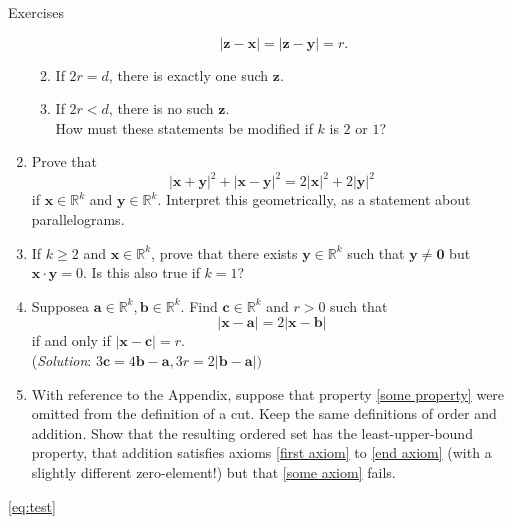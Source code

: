 \begin{xcb}{Exercises}
\begin{enumerate}
\begin{enumerate}
\begin{equation*}
        \left|\boldsymbol{z}-\boldsymbol{x}\right|=\left|\boldsymbol{z}-\boldsymbol{y}\right|=r.
      \end{equation*}
      \item If $2r=d$, there is exactly one such $\boldsymbol{z}$.
      \item If $2r<d$, there is no such $\boldsymbol{z}$.\\
      How must these statements be modified if $k$ is $2$ or $1$?
    \end{enumerate}
    \item Prove that
    \begin{equation*}
      \left|\boldsymbol{x}+\boldsymbol{y}\right|^2+\left|\boldsymbol{x}-\boldsymbol{y}\right|^2=2\left|\boldsymbol{x}\right|^2+2\left|\boldsymbol{y}\right|^2
    \end{equation*}
    if $\boldsymbol{x}\in \mathbb{R}^k$ and $\boldsymbol{y}\in \mathbb{R}^k$. Interpret this geometrically, as a statement about parallelograms. 
    \item If $k \geq 2$ and $\boldsymbol{x} \in \mathbb{R}^k$, prove that there exists $\boldsymbol{y} \in \mathbb{R}^k$ such that $\boldsymbol{y} \neq \boldsymbol{0}$
    but $\boldsymbol{x} \cdot \boldsymbol{y}=0$. Is this also true if $k=1$?
    \item Supposea $\boldsymbol{a} \in \mathbb{R}^k,\boldsymbol{b} \in \mathbb{R}^k$. Find $\boldsymbol{c} \in \mathbb{R}^k$ and $r> 0$ such 
    that 
    \begin{equation*}
      \left|\boldsymbol{x}-\boldsymbol{a}\right|=2\left|\boldsymbol{x}-\boldsymbol{b}\right|
    \end{equation*}
    if and only if $\left|\boldsymbol{x}-\boldsymbol{c}\right|=r$.\\
    (\emph{Solution}: $3\boldsymbol{c}=4\boldsymbol{b}-\boldsymbol{a},3r=2\left|\boldsymbol{b}-\boldsymbol{a}\right|)$
    \item With reference to the Appendix, suppose that property \ref{some property} were omitted from the definition of a cut. 
    Keep the same definitions of order and addition. Show that the resulting ordered set has the least-upper-bound property, 
    that addition satisfies axioms \ref{first axiom} to \ref{end axiom} (with a slightly different zero-element!) but that \ref{some axiom} fails.
  \end{enumerate}
\end{xcb}


\ref{eq:test}


\endinput

